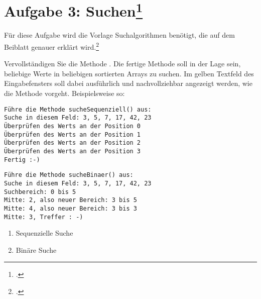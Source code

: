 \documentclass{lehramt-informatik-aufgabe}
\begin{document}

\section{Aufgabe 3: Suchen\footcite{aud:ab:2}}

Für diese Aufgabe wird die Vorlage Suchalgorithmen benötigt, die auf dem
Beiblatt genauer erklärt wird.\footcite{Diese Aufgabe stammt aus dem
Übungsblatt 1 zu Algorithmen und Datenstrukturen von Prof. Dr. Martin
Hennecke und Rainer Gall an der Universität Würzburg und wurde
dankenswerterweise zur Verwendung in diesem Aufgabenblatt zur Verfügung
gestellt.}

Vervollständigen Sie die Methode . Die fertige
Methode soll in der Lage sein, beliebige Werte in beliebigen sortierten
Arrays zu suchen. Im gelben Textfeld des Eingabefensters soll dabei
ausführlich und nachvollziehbar angezeigt werden, wie die Methode
vorgeht. Beispielsweise so:

{
\tiny
\begin{multicols}{2}
\begin{verbatim}
Führe die Methode sucheSequenziell() aus:
Suche in diesem Feld: 3, 5, 7, 17, 42, 23
Überprüfen des Werts an der Position 0
Überprüfen des Werts an der Position 1
Überprüfen des Werts an der Position 2
Überprüfen des Werts an der Position 3
Fertig :-)
\end{verbatim}

\begin{verbatim}
Führe die Methode sucheBinaer() aus:
Suche in diesem Feld: 3, 5, 7, 17, 42, 23
Suchbereich: 0 bis 5
Mitte: 2, also neuer Bereich: 3 bis 5
Mitte: 4, also neuer Bereich: 3 bis 3
Mitte: 3, Treffer : -)
\end{verbatim}
\end{multicols}
}

\begin{enumerate}
\item Sequenzielle Suche
\begin{liAntwort}
\end{liAntwort}

\item Binäre Suche

\begin{liAntwort}
\end{liAntwort}

\end{enumerate}
\end{document}
